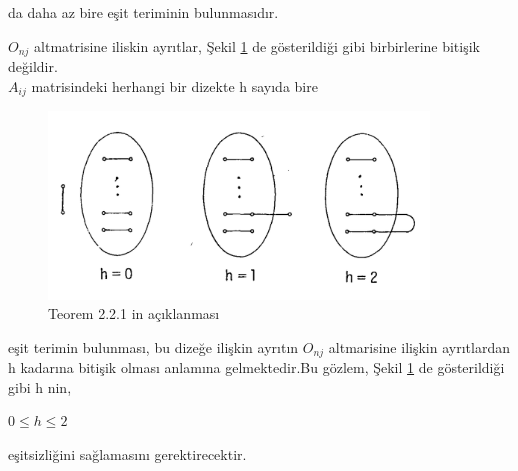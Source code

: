 \documentclass[11pt]{amsbook}
\begin{document}
da daha az bire eşit teriminin bulunmasıdır.

	\begin{definition}
		$O_{nj}$ altmatrisine iliskin ayrıtlar, Şekil \ref{fig:2.2.3} de gösterildiği gibi birbirlerine bitişik değildir.\\
		$A_{ij}$ matrisindeki herhangi bir dizekte h sayıda bire
		\begin{figure}[h] \centering \includegraphics[width=0.9\textwidth,keepaspectratio=true]{images/ceyhun-058-fig01}\caption{ Teorem 2.2.1 in açıklanması} \label{fig:2.2.3} \end{figure}
	\end{definition}
	
	eşit terimin bulunması, bu dizeğe ilişkin ayrıtın $O_{nj}$ altmarisine ilişkin ayrıtlardan h kadarına bitişik olması anlamına gelmektedir.Bu gözlem, 
	Şekil \ref{fig:2.2.3} de gösterildiği gibi h nin, 

	
		$0\leq h \leq 2$
	
	eşitsizliğini sağlamasını gerektirecektir.
\end{document}
